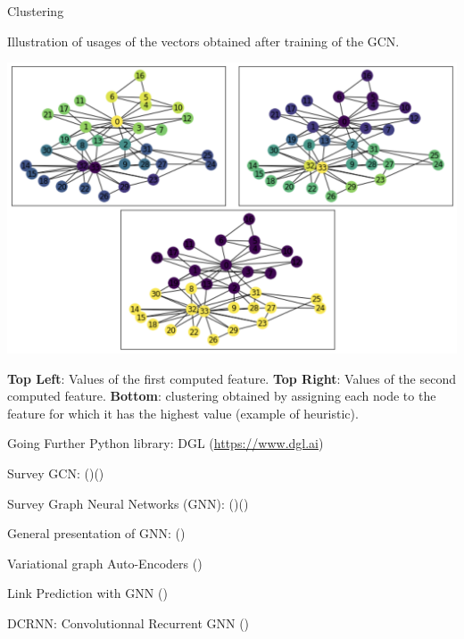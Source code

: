 \documentclass[a4paper,11pt]{book}
\begin{document}
\begin{textbox}{Clustering}
\centering

Illustration of usages of the vectors obtained after training of the GCN. 

\centering
\includegraphics[width=0.8\linewidth]{pics/ZKCGCNresult.png}




\textbf{Top Left}: Values of the first computed feature. \textbf{Top Right}: Values of the second computed feature. \textbf{Bottom}: clustering obtained by assigning each node to the feature for which it has the highest value (example of heuristic).
\end{textbox}





\begin{textbox}{Going Further}
Python library: DGL (\url{https://www.dgl.ai})

Survey GCN: (\cite{zhang2019graph})(\cite{zhang2018graph})

Survey Graph Neural Networks (GNN): (\cite{zhou2018graph})(\cite{wu2020comprehensive})

General presentation of GNN: (\cite{xu2018powerful})

Variational graph Auto-Encoders (\cite{kipf2016variational})

Link Prediction with GNN (\cite{zhang2018link})

DCRNN: Convolutionnal Recurrent GNN (\cite{li2017diffusion})


\end{textbox}



\end{document}
